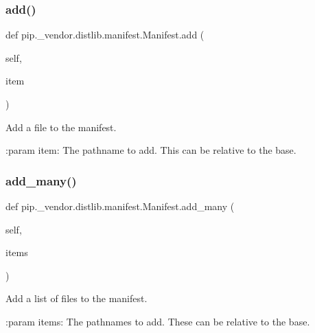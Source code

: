 \subsubsection{\texorpdfstring{add()}{add()}}
{\footnotesize\ttfamily def pip.\+\_\+vendor.\+distlib.\+manifest.\+Manifest.\+add (\begin{DoxyParamCaption}\item[{}]{self,  }\item[{}]{item }\end{DoxyParamCaption})}

\begin{DoxyVerb}Add a file to the manifest.

:param item: The pathname to add. This can be relative to the base.
\end{DoxyVerb}
 \mbox{\label{classpip_1_1__vendor_1_1distlib_1_1manifest_1_1Manifest_aa18ac58e0425c6d4de8ac182a52145fe}} 
\subsubsection{\texorpdfstring{add\+\_\+many()}{add\_many()}}
{\footnotesize\ttfamily def pip.\+\_\+vendor.\+distlib.\+manifest.\+Manifest.\+add\+\_\+many (\begin{DoxyParamCaption}\item[{}]{self,  }\item[{}]{items }\end{DoxyParamCaption})}

\begin{DoxyVerb}Add a list of files to the manifest.

:param items: The pathnames to add. These can be relative to the base.
\end{DoxyVerb}
 \mbox{\label{classpip_1_1__vendor_1_1distlib_1_1manifest_1_1Manifest_ac5d289057626a72d1d8c6322b766df56}} 
